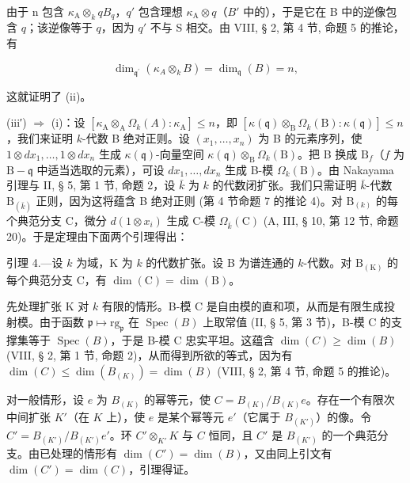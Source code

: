 由于 n 包含 \(\kappa_{\mathrm{A}} \otimes_{k} qB_{q}\)，\(q'\) 包含理想 \(\kappa_{\mathrm{A}} \otimes q\)（\(B'\) 中的），于是它在 B 中的逆像包含 \(q\)；该逆像等于 \(q\)，因为 \(q'\) 不与 S 相交。由 VIII, § 2, 第 4 节, 命题 5 的推论，有

\[
\dim_ {\mathfrak {q} ^ {\prime}} \left(\kappa_ {A} \otimes_ {k} B\right) = \dim_ {\mathfrak {q}} (B) = n,
\]

这就证明了 (ii)。

(iii′) \(\Rightarrow\) (i)：设 \([\kappa_{\mathrm{A}}\otimes_{\mathrm{A}}\Omega_{k}(A):\kappa_{\mathrm{A}}]\leqslant n\)，即 \([\kappa (\mathfrak{q})\otimes_{\mathrm{B}}\Omega_{k}(\mathrm{B}):\kappa (\mathfrak{q})]\leqslant n\)，我们来证明 \(k\)-代数 B 绝对正则。设 \((x_{1},\ldots ,x_{n})\) 为 B 的元素序列，使 \(1\otimes dx_1,\dots ,1\otimes dx_n\) 生成 \(\kappa (\mathfrak{q})\)-向量空间 \(\kappa (\mathfrak{q})\otimes_{\mathrm{B}}\Omega_{k}(\mathrm{B})\)。把 B 换成 \(\mathrm{B}_f\)（\(f\) 为 \(\mathrm{B} - \mathfrak{q}\) 中适当选取的元素），可设 \(dx_{1},\ldots ,dx_{n}\) 生成 B-模 \(\Omega_k(\mathrm{B})\)。由 Nakayama 引理与 II, § 5, 第 1 节, 命题 2，设 \(\bar{k}\) 为 \(k\) 的代数闭扩张。我们只需证明 \(\bar{k}\)-代数 \(\mathrm{B}_{(\bar{k})}\) 正则，因为这将蕴含 B 绝对正则 (第 4 节命题 7 的推论 4)。对 \(\mathrm{B}_{(k)}\) 的每个典范分支 C，微分 \(d(1\otimes x_i)\) 生成 C-模 \(\Omega_{\bar{k}}(\mathrm{C})\) (A, III, § 10, 第 12 节, 命题 20)。于是定理由下面两个引理得出：

引理 4.—设 \(k\) 为域，K 为 \(k\) 的代数扩张。设 B 为谱连通的 \(k\)-代数。对 \(\mathrm{B}_{(\mathrm{K})}\) 的每个典范分支 C，有 \(\dim(\mathrm{C}) = \dim(\mathrm{B})\)。

先处理扩张 K 对 \(k\) 有限的情形。B-模 C 是自由模的直和项，从而是有限生成投射模。由于函数 \(\mathfrak{p} \mapsto \mathrm{rg}_{\mathfrak{p}}\) 在 \(\operatorname{Spec}(B)\) 上取常值 (II, § 5, 第 3 节)，B-模 C 的支撑集等于 \(\operatorname{Spec}(B)\)，于是 B-模 C 忠实平坦。这蕴含 \(\dim(C) \geqslant \dim(B)\) (VIII, § 2, 第 1 节, 命题 2)，从而得到所欲的等式，因为有 \(\dim(C) \leqslant \dim(B_{(K)}) = \dim(B)\) (VIII, § 2, 第 4 节, 命题 5 的推论)。

对一般情形，设 \(e\) 为 \(B_{(K)}\) 的幂等元，使 \(C = B_{(K)}/B_{(K)}e\)。存在一个有限次中间扩张 \(K'\)（在 \(K\) 上），使 \(e\) 是某个幂等元 \(e'\)（它属于 \(B_{(K')}\)）的像。令 \(C' = B_{(K')} / B_{(K')}e'\)。环 \(C' \otimes_{K'} K\) 与 \(C\) 恒同，且 \(C'\) 是 \(B_{(K')}\) 的一个典范分支。由已处理的情形有 \(\dim(C') = \dim(B)\)，又由同上引文有 \(\dim(C') = \dim(C)\)，引理得证。

